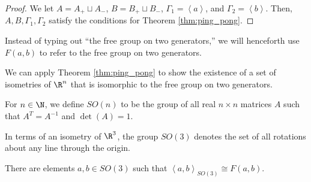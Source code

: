 \begin{proof}
  We let $A = A_{+}\sqcup A_{-}$, $B = B_{+}\sqcup B_{-}$, $\Gamma_1 = \left\langle a \right\rangle$, and $\Gamma_2 = \left\langle b \right\rangle$. Then, $A,B,\Gamma_1,\Gamma_2$ satisfy the conditions for Theorem \ref{thm:ping_pong}.
\end{proof}
\begin{remark}
Instead of typing out ``the free group on two generators,'' we will henceforth use $F(a,b)$ to refer to the free group on two generators.
\end{remark}

We can apply Theorem \ref{thm:ping_pong} to show the existence of a set of isometries of $\R^n$ that is isomorphic to the free group on two generators.
\begin{definition}
  For $n\in \N$, we define $SO(n)$ to be the group of all real $n\times n$ matrices $A$ such that $A^{T} = A^{-1}$ and $\det(A) = 1$.
\end{definition}
In terms of an isometry of $\R^3$, the group $SO(3)$ denotes the set of all rotations about any line through the origin.
\begin{theorem}\label{thm:free_group_so3}
  There are elements $a,b\in SO(3)$ such that $\left\langle a,b \right\rangle_{SO(3)} \cong F(a,b)$.
\end{theorem}
